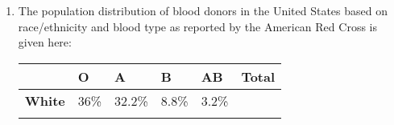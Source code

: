\documentclass[]{book}
\begin{document}
\begin{enumerate}
\def\labelenumi{\arabic{enumi}.}
\item
  The population distribution of blood donors in the United States based
  on race/ethnicity and blood type as reported by the American Red Cross
  is given here:

  \begin{longtable}[]{@{}llllll@{}}
  \toprule
  \begin{minipage}[b]{0.15\columnwidth}\raggedright\strut
  \(\,\)\strut
  \end{minipage} &
  \begin{minipage}[b]{0.10\columnwidth}\raggedright\strut
  O\strut
  \end{minipage} &
  \begin{minipage}[b]{0.12\columnwidth}\raggedright\strut
  A\strut
  \end{minipage} &
  \begin{minipage}[b]{0.10\columnwidth}\raggedright\strut
  B\strut
  \end{minipage} &
  \begin{minipage}[b]{0.10\columnwidth}\raggedright\strut
  AB\strut
  \end{minipage} &
  \begin{minipage}[b]{0.10\columnwidth}\raggedright\strut
  Total\strut
  \end{minipage}\tabularnewline
  \midrule
  \endhead
  \begin{minipage}[t]{0.15\columnwidth}\raggedright\strut
  \textbf{White}\strut
  \end{minipage} &
  \begin{minipage}[t]{0.10\columnwidth}\raggedright\strut
  36\%\strut
  \end{minipage} &
  \begin{minipage}[t]{0.12\columnwidth}\raggedright\strut
  32.2\%\strut
  \end{minipage} &
  \begin{minipage}[t]{0.10\columnwidth}\raggedright\strut
  8.8\%\strut
  \end{minipage} &
  \begin{minipage}[t]{0.10\columnwidth}\raggedright\strut
  3.2\%\strut
  \end{minipage} &
  \begin{minipage}[t]{0.10\columnwidth}\raggedright\strut
  \(\,\)\strut
  \end{minipage}\tabularnewline
  \begin{minipage}[t]{0.15\columnwidth}\raggedright\strut

\end{minipage}
\end{longtable}
\end{enumerate}
\end{document}
